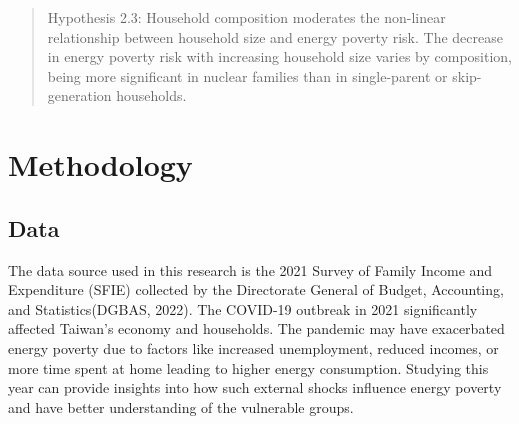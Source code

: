 \documentclass[
  twoside,
  openright,
  degree    = master,               %
  language  = english,              %
  fontset   = overleaf,             %
  watermark = true,                 %
  doi       = true,                 %
]{ntuthesis}
\begin{document}
\begin{quote}
Hypothesis 2.3: Household composition moderates the non-linear
relationship between household size and energy poverty risk. The
decrease in energy poverty risk with increasing household size varies by
composition, being more significant in nuclear families than in
single-parent or skip-generation households.
\end{quote}

\hypertarget{sec:methodology}{%
\chapter{Methodology}\label{sec:methodology}}

\hypertarget{data}{%
\section{Data}\label{data}}

The data source used in this research is the 2021 Survey of Family
Income and Expenditure (SFIE) collected by the Directorate General of
Budget, Accounting, and Statistics(DGBAS, 2022). The COVID-19 outbreak
in 2021 significantly affected Taiwan's economy and households. The
pandemic may have exacerbated energy poverty due to factors like
increased unemployment, reduced incomes, or more time spent at home
leading to higher energy consumption. Studying this year can provide
insights into how such external shocks influence energy poverty and have
better understanding of the vulnerable groups.
\end{document}
